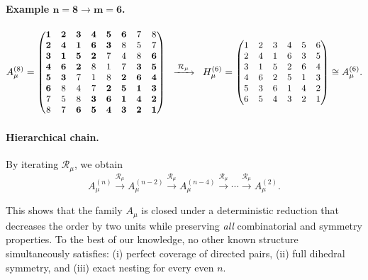 \documentclass{article}
\begin{document}
\paragraph{Example \(\boldsymbol{n=8\to m=6}\).}


\[
\small
A_\mu^{(8)}=
\begin{pmatrix}
\textbf1&\textbf2&\textbf3&\textbf4&\textbf5&\textbf6&7&8\\
\textbf2&\textbf4&\textbf1&\textbf6&\textbf3&8&5&7\\
\textbf{3}&\textbf1&\textbf5&\textbf2&7&4&8&\textbf6\\
\textbf4&\textbf6&\textbf2&8&1&7&\textbf3&\textbf5\\
\textbf5&\textbf3&7&1&8&\textbf2&\textbf6&\textbf4\\
\textbf6&8&4&7&\textbf2&\textbf5&\textbf1&\textbf3\\
7&5&8&\textbf3&\textbf6&\textbf1&\textbf4&\textbf2\\
8&7&\textbf6&\textbf5&\textbf4&\textbf3&\textbf2&\textbf1
\end{pmatrix}
\;\;\xrightarrow{\;\mathcal{R}_\mu\;}\;\;
H_\mu^{(6)}=
\begin{pmatrix}
1&2&3&4&5&6\\
2&4&1&6&3&5\\
3&1&5&2&6&4\\
4&6&2&5&1&3\\
5&3&6&1&4&2\\
6&5&4&3&2&1
\end{pmatrix}
\cong A_\mu^{(6)}.
\]

\paragraph{Hierarchical chain.}

By iterating \(\mathcal{R}_\mu\), we obtain
\[
A_\mu^{(n)} \xrightarrow{\mathcal{R}_\mu} A_\mu^{(n-2)} \xrightarrow{\mathcal{R}_\mu} A_\mu^{(n-4)} \xrightarrow{\mathcal{R}_\mu} \cdots \xrightarrow{\mathcal{R}_\mu} A_\mu^{(2)}.
\]

This shows that the family \(A_\mu\) is closed under a deterministic reduction that decreases the order by two units while preserving \emph{all} combinatorial and symmetry properties. To the best of our knowledge, no other known structure simultaneously satisfies:  
(i) perfect coverage of directed pairs,  
(ii) full dihedral symmetry, and  
(iii) exact nesting for every even \(n\).
\end{document}
